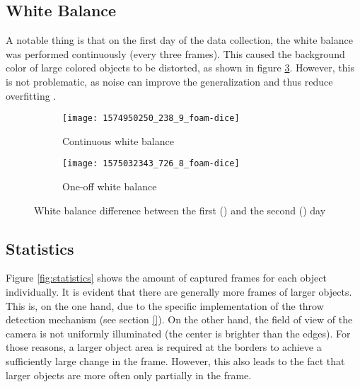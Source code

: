 \subsection{White Balance}
\label{subsec:training_of_the_cnn:dataset:white_balance}

A notable thing is that on the first day of the data collection, the white balance was performed continuously (every three frames). %
This caused the background color of large colored objects to be distorted, as shown in figure \ref{fig:white_balance}.
However, this is not problematic, as noise can improve the generalization and thus reduce overfitting \cite{}. %

\begin{figure}[t]
  \centering
  \begin{subfigure}[b]{0.45\textwidth}
    \centering
    \texttt{[image: 1574950250\_238\_9\_foam-dice]} %
    \caption{Continuous white balance}
    \label{subfig:white_balance_first_day}
  \end{subfigure}
  \begin{subfigure}[b]{0.45\textwidth}
    \centering
    \texttt{[image: 1575032343\_726\_8\_foam-dice]}
    \caption{One-off white balance}
    \label{subfig:white_balance_second_day}
  \end{subfigure}
  \caption{White balance difference between the first () and the second () day}
  \label{fig:white_balance}
\end{figure}








\subsection{Statistics}
\label{subsec:training_of_the_cnn:dataset:statistics}

Figure \ref{fig:statistics} shows the amount of captured frames for each object individually.
It is evident that there are generally more frames of larger objects.
This is, on the one hand, due to the specific implementation of the throw detection mechanism (see section \ref{}). %
On the other hand, the field of view of the camera is not uniformly illuminated (the center is brighter than the edges).
For those reasons, a larger object area is required at the borders to achieve a sufficiently large change in the frame.
However, this also leads to the fact that larger objects are more often only partially in the frame.

